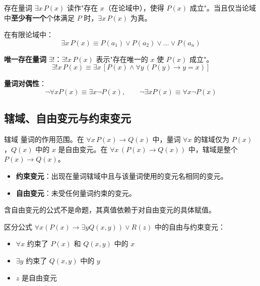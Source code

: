 \begin{mydefinition}{存在量词}
$\exists x \, P(x)$ 读作"存在 $x$（在论域中），使得 $P(x)$ 成立"。当且仅当论域中\textbf{至少有一个}个体满足 $P$ 时，$\exists x \, P(x)$ 为真。

在有限论域中：
\[\exists x \, P(x) \equiv P(a_1) \lor P(a_2) \lor \dots \lor P(a_n)\]
\end{mydefinition}

\textbf{唯一存在量词} $\exists!$：$\exists! x \, P(x)$ 表示"存在唯一的 $x$ 使 $P(x)$ 成立"。
\[\exists! x\, P(x) \equiv \exists x\, [P(x) \land \forall y\, (P(y) \rightarrow y = x)]\]

\textbf{量词对偶性}：
\[\neg\forall x P(x) \equiv \exists x \neg P(x),\qquad \neg\exists x P(x) \equiv \forall x \neg P(x)\]

\subsection{辖域、自由变元与约束变元}

\begin{mydefinition}{辖域}
量词的作用范围。在 $\forall x \, P(x) \rightarrow Q(x)$ 中，量词 $\forall x$ 的辖域仅为 $P(x)$，$Q(x)$ 中的 $x$ 是自由变元。在 $\forall x \, (P(x) \rightarrow Q(x))$ 中，辖域是整个 $P(x) \rightarrow Q(x)$。
\end{mydefinition}

\begin{itemize}
\item \textbf{约束变元}：出现在量词辖域中且与该量词使用的变元名相同的变元。
\item \textbf{自由变元}：未受任何量词约束的变元。
\end{itemize}

含自由变元的公式不是命题，其真值依赖于对自由变元的具体赋值。

\begin{example}
区分公式 $\forall x (P(x) \rightarrow \exists y Q(x,y)) \lor R(z)$ 中的自由与约束变元：
\begin{itemize}
\item $\forall x$ 约束了 $P(x)$ 和 $Q(x,y)$ 中的 $x$
\item $\exists y$ 约束了 $Q(x,y)$ 中的 $y$
\item $z$ 是自由变元
\end{itemize}
\end{example}

